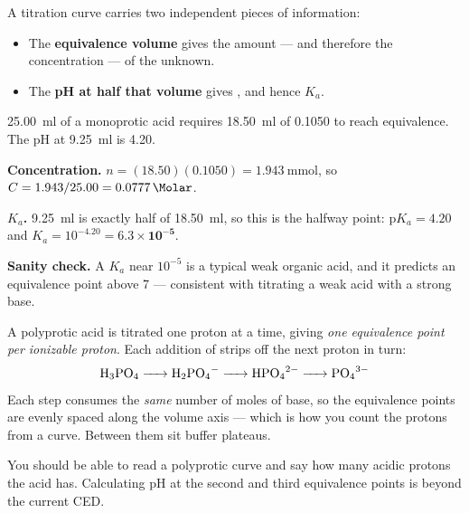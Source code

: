 \documentclass{apchem-notes}
\begin{document}
A titration curve carries two independent pieces of information:

\begin{itemize}[leftmargin=*,itemsep=0.3em]
  \item The \textbf{equivalence volume} gives the amount --- and therefore
        the concentration --- of the unknown.
  \item The \textbf{pH at half that volume} gives
        , and hence $K_a$.
\end{itemize}

\begin{workedexample}
\SI{25.00}{\milli\litre} of a monoprotic acid requires
\SI{18.50}{\milli\litre} of \SI{0.1050}{\Molar}  to reach
equivalence. The pH at \SI{9.25}{\milli\litre} is 4.20.

\textbf{Concentration.} $n = (18.50)(0.1050) = \SI{1.943}{\milli\mole}$, so
$C = 1.943/25.00 = \SI{0.0777}{\Molar}$.

\textbf{$K_a$.} \SI{9.25}{\milli\litre} is exactly half of
\SI{18.50}{\milli\litre}, so this is the halfway point:
$\mathrm{p}K_a = 4.20$ and
$K_a = 10^{-4.20} = \mathbf{6.3\times10^{-5}}$.

\textbf{Sanity check.} A $K_a$ near $10^{-5}$ is a typical weak organic
acid, and it predicts an equivalence point above 7 --- consistent with
titrating a weak acid with a strong base.
\end{workedexample}


\begin{apcnote}
A polyprotic acid is titrated one proton at a time, giving \emph{one
equivalence point per ionizable proton}. Each addition of  strips
off the next proton in turn:
\[ \ce{H3PO4 -> H2PO4^- -> HPO4^2- -> PO4^3-} \]
Each step consumes the \emph{same} number of moles of base, so the
equivalence points are evenly spaced along the volume axis --- which is how
you count the protons from a curve. Between them sit buffer plateaus.

You should be able to read a polyprotic curve and say how many acidic
protons the acid has. Calculating pH at the second and third equivalence
points is beyond the current CED.
\end{apcnote}

\end{document}

